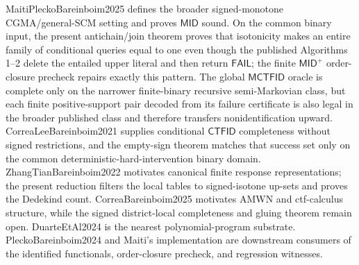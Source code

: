 MaitiPleckoBareinboim2025 defines the broader signed-monotone CGMA/general-SCM setting and proves \(\mathsf{MID}\) sound.  On the common binary input, the present antichain/join theorem proves that isotonicity makes an entire family of conditional queries equal to one even though the published Algorithms 1--2 delete the entailed upper literal and then return \(\mathsf{FAIL}\); the finite \(\mathsf{MID}^{+}\) order-closure precheck repairs exactly this pattern.  The global \(\mathsf{MCTFID}\) oracle is complete only on the narrower finite-binary recursive semi-Markovian class, but each finite positive-support pair decoded from its failure certificate is also legal in the broader published class and therefore transfers nonidentification upward.  CorreaLeeBareinboim2021 supplies conditional \(\mathsf{CTFID}\) completeness without signed restrictions, and the empty-sign theorem matches that success set only on the common deterministic-hard-intervention binary domain.  ZhangTianBareinboim2022 motivates canonical finite response representations; the present reduction filters the local tables to signed-isotone up-sets and proves the Dedekind count.  CorreaBareinboim2025 motivates AMWN and ctf-calculus structure, while the signed district-local completeness and gluing theorem remain open.  DuarteEtAl2024 is the nearest polynomial-program substrate.  PleckoBareinboim2024 and Maiti's implementation are downstream consumers of the identified functionals, order-closure precheck, and regression witnesses.